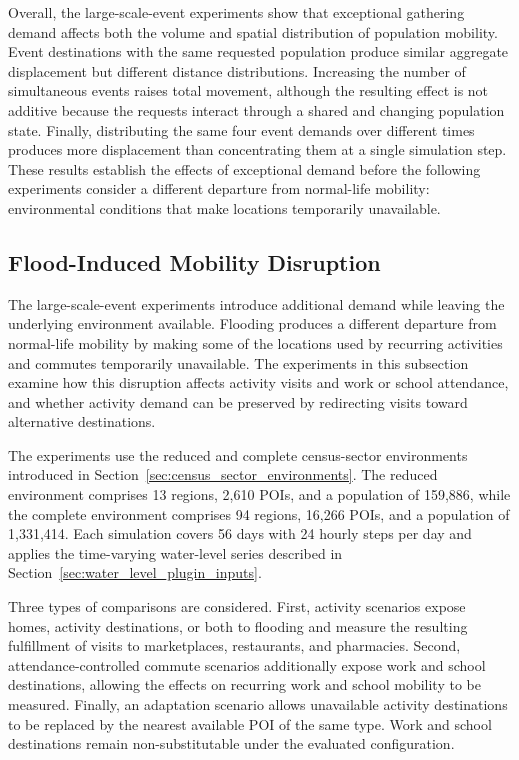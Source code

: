 Overall, the large-scale-event experiments show that exceptional gathering demand affects both the volume and spatial distribution of population mobility. Event destinations with the same requested population produce similar aggregate displacement but different distance distributions. Increasing the number of simultaneous events raises total movement, although the resulting effect is not additive because the requests interact through a shared and changing population state. Finally, distributing the same four event demands over different times produces more displacement than concentrating them at a single simulation step. These results establish the effects of exceptional demand before the following experiments consider a different departure from normal-life mobility: environmental conditions that make locations temporarily unavailable.


\subsection{Flood-Induced Mobility Disruption}
\label{sec:results_flood_mobility}

The large-scale-event experiments introduce additional demand while leaving the underlying environment available. Flooding produces a different departure from normal-life mobility by making some of the locations used by recurring activities and commutes temporarily unavailable. The experiments in this subsection examine how this disruption affects activity visits and work or school attendance, and whether activity demand can be preserved by redirecting visits toward alternative destinations.

The experiments use the reduced and complete census-sector environments introduced in Section~\ref{sec:census_sector_environments}. The reduced environment comprises 13 regions, 2,610 POIs, and a population of 159,886, while the complete environment comprises 94 regions, 16,266 POIs, and a population of 1,331,414. Each simulation covers 56 days with 24 hourly steps per day and applies the time-varying water-level series described in Section~\ref{sec:water_level_plugin_inputs}.

Three types of comparisons are considered. First, activity scenarios expose homes, activity destinations, or both to flooding and measure the resulting fulfillment of visits to marketplaces, restaurants, and pharmacies. Second, attendance-controlled commute scenarios additionally expose work and school destinations, allowing the effects on recurring work and school mobility to be measured. Finally, an adaptation scenario allows unavailable activity destinations to be replaced by the nearest available POI of the same type. Work and school destinations remain non-substitutable under the evaluated configuration.


